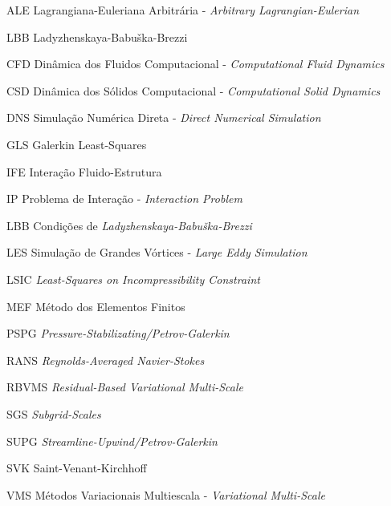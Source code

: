 \documentclass[12pt,
	openright,	%
	twoside,    %
	a4paper,			%
	sumario=tradicional,
	english,			%
	french, 			%
	brazil				%
]{USPSC}
\begin{document}
\listoffigures*
\cleardoublepage
\listoftables*
\cleardoublepage
\begin{siglas}
    \item[ALE] Lagrangiana-Euleriana Arbitrária - \textit{Arbitrary Lagrangian-Eulerian}
    \item[LBB] Ladyzhenskaya-Babuška-Brezzi
    \item[CFD] Dinâmica dos Fluidos Computacional - \textit{Computational Fluid Dynamics}
    \item[CSD] Dinâmica dos Sólidos Computacional - \textit{Computational Solid Dynamics}
    \item[DNS] Simulação Numérica Direta - \textit{Direct Numerical Simulation}
    \item[GLS] Galerkin Least-Squares
    \item[IFE] Interação Fluido-Estrutura
    \item[IP] Problema de Interação - \textit{Interaction Problem}
    \item[LBB] Condições de \textit{Ladyzhenskaya-Babuška-Brezzi}
    \item[LES] Simulação de Grandes Vórtices - \textit{Large Eddy Simulation}
    \item[LSIC] \textit{Least-Squares on Incompressibility Constraint}
    \item[MEF] Método dos Elementos Finitos
    \item[PSPG] \textit{Pressure-Stabilizating/Petrov-Galerkin}
    \item[RANS] \textit{Reynolds-Averaged Navier-Stokes}
    \item[RBVMS] \textit{Residual-Based Variational Multi-Scale}
    \item[SGS] \textit{Subgrid-Scales}
    \item[SUPG] \textit{Streamline-Upwind/Petrov-Galerkin}
    \item[SVK] Saint-Venant-Kirchhoff
    \item[VMS] Métodos Variacionais Multiescala - \textit{Variational Multi-Scale}
\end{siglas}
\end{document}
